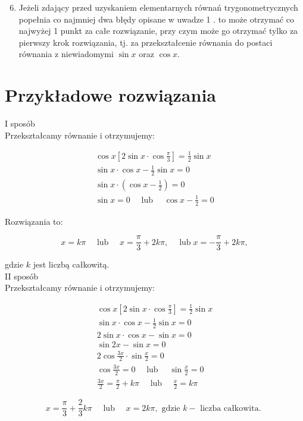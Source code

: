 \documentclass[10pt]{article}
\begin{document}
\begin{enumerate}
  \setcounter{enumi}{5}
  \item Jeżeli zdający przed uzyskaniem elementarnych równań trygonometrycznych popełnia co najmniej dwa błędy opisane w uwadze 1 . to może otrzymać co najwyżej 1 punkt za całe rozwiązanie, przy czym może go otrzymać tylko za pierwszy krok rozwiązania, tj. za przekształcenie równania do postaci równania z niewiadomymi $\sin x$ oraz $\cos x$.
\end{enumerate}

\section*{Przykładowe rozwiązania}
I sposób\\
Przekształcamy równanie i otrzymujemy:

$$
\begin{gathered}
\cos x\left[2 \sin x \cdot \cos \frac{\pi}{3}\right]=\frac{1}{2} \sin x \\
\sin x \cdot \cos x-\frac{1}{2} \sin x=0 \\
\sin x \cdot\left(\cos x-\frac{1}{2}\right)=0 \\
\sin x=0 \quad \text { lub } \quad \cos x-\frac{1}{2}=0
\end{gathered}
$$

Rozwiązania to:

$$
x=k \pi \quad \text { lub } \quad x=\frac{\pi}{3}+2 k \pi, \quad \operatorname{lub} x=-\frac{\pi}{3}+2 k \pi,
$$

gdzie $k$ jest liczbą całkowitą.\\
II sposób\\
Przekształcamy równanie i otrzymujemy:

$$
\begin{gathered}
\cos x\left[2 \sin x \cdot \cos \frac{\pi}{3}\right]=\frac{1}{2} \sin x \\
\sin x \cdot \cos x-\frac{1}{2} \sin x=0 \\
2 \sin x \cdot \cos x-\sin x=0 \\
\sin 2 x-\sin x=0 \\
2 \cos \frac{3 x}{2} \cdot \sin \frac{x}{2}=0 \\
\cos \frac{3 x}{2}=0 \quad \text { lub } \quad \sin \frac{x}{2}=0 \\
\frac{3 x}{2}=\frac{\pi}{2}+k \pi \quad \text { lub } \quad \frac{x}{2}=k \pi
\end{gathered}
$$

$$
x=\frac{\pi}{3}+\frac{2}{3} k \pi \quad \text { lub } \quad x=2 k \pi, \text { gdzie } k-\text { liczba całkowita. }
$$
\end{document}
